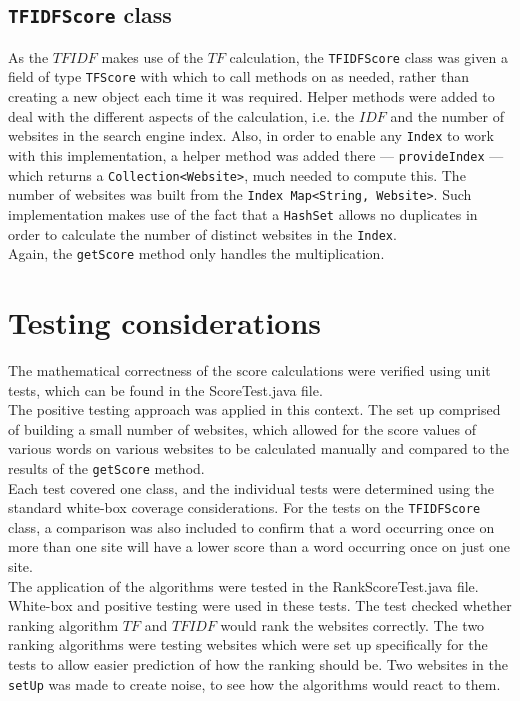 \subsection{{\tt TFIDFScore} class}
As the $TFIDF$ makes use of the $TF$ calculation, the {\tt TFIDFScore} class was given a field of type {\tt TFScore} with which to call methods on as needed, rather than creating a new object each time it was required. Helper methods were added to deal with the different aspects of the calculation, i.e. the $IDF$ and the number of websites in the search engine index. Also, in order to enable any {\tt Index} to work with this implementation, a helper method was added there — {\tt provideIndex} — which returns a {\tt Collection<Website>}, much needed to compute this. The number of websites was built from the {\tt Index Map<String, Website>}. Such implementation makes use of the fact that a {\tt HashSet} allows no duplicates in order to calculate the number of distinct websites in the {\tt Index}.\\
Again, the {\tt getScore} method only handles the multiplication.

\section{Testing considerations}
The mathematical correctness of the score calculations were verified using unit tests, which can be found in the ScoreTest.java file.\\
The positive testing approach was applied in this context.
The set up comprised of building a small number of websites, which allowed for the score values of various words on various websites to be calculated manually and compared to the results of the {\tt getScore} method.\\
Each test covered one class, and the individual tests were determined using the standard white-box coverage considerations. For the tests on the {\tt TFIDFScore} class, a comparison was also included to confirm that a word occurring once on more than one site will have a lower score than a word occurring once on just one site.\\
The application of the algorithms were tested in the RankScoreTest.java file. White-box and positive testing were used in these tests. The test checked whether ranking algorithm $TF$ and $TFIDF$ would rank the websites correctly. The two ranking algorithms were testing websites which were set up specifically for the tests to allow easier prediction of how the ranking should be. Two websites in the {\tt setUp} was made to create noise, to see how the algorithms would react to them.

